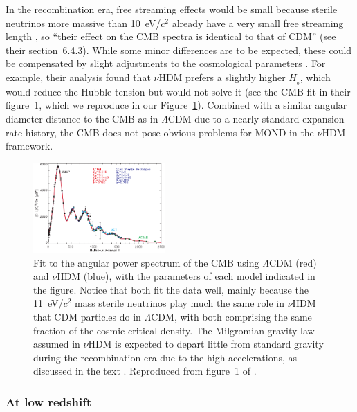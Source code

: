 \documentclass[fleqn,usenatbib,useAMS,onecolumn]{mnras} %
\begin{document}
In the recombination era, free streaming effects would be small because sterile neutrinos more massive than 10~eV/$c^2$ already have a very small free streaming length \citep{Planck_2016}, so ``their effect on the CMB spectra is identical to that of CDM'' (see their section~6.4.3). While some minor differences are to be expected, these could be compensated by slight adjustments to the cosmological parameters \citep{Angus_Diaferio_2011}. For example, their analysis found that $\nu$HDM prefers a slightly higher $H_{_0}$, which would reduce the Hubble tension but would not solve it (see the CMB fit in their figure~1, which we reproduce in our Figure~\ref{Angus_Diaferio_2011_Figure_1}). Combined with a similar angular diameter distance to the CMB as in $\Lambda$CDM due to a nearly standard expansion rate history, the CMB does not pose obvious problems for MOND in the $\nu$HDM framework.

\begin{figure}
	\centering
	\includegraphics[width=0.45\textwidth]{Angus_Diaferio_2011_Figure_1}
	\caption{Fit to the angular power spectrum of the CMB using $\Lambda$CDM (red) and $\nu$HDM (blue), with the parameters of each model indicated in the figure. Notice that both fit the data well, mainly because the 11~eV/$c^2$ mass sterile neutrinos play much the same role in $\nu$HDM that CDM particles do in $\Lambda$CDM, with both comprising the same fraction of the cosmic critical density. The Milgromian gravity law assumed in $\nu$HDM is expected to depart little from standard gravity during the recombination era due to the high accelerations, as discussed in the text \citep[see also][]{Haslbauer_2020}. Reproduced from figure~1 of \citet{Angus_Diaferio_2011}.}
	\label{Angus_Diaferio_2011_Figure_1}
\end{figure}


\subsubsection{At low redshift}
\label{nuHDM_late}
\end{document}

